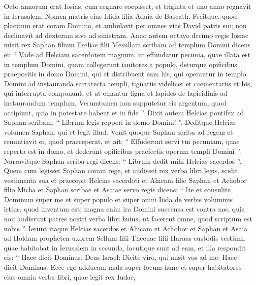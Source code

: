 \begin{biblechapter}
\begin{biblechapter}
\begin{biblechapter}
\begin{biblechapter}
\begin{biblechapter}
\begin{biblechapter}
\begin{biblechapter}
\begin{biblechapter}
\begin{biblechapter}
\begin{biblechapter}
\begin{biblechapter}
\begin{biblechapter}
\begin{biblechapter}
\begin{biblechapter}
\begin{biblechapter}
\begin{biblechapter}
\begin{biblechapter}
\begin{biblechapter}
\begin{biblechapter}
\begin{biblechapter}
\begin{biblechapter}
\begin{biblechapter}
 \verse Octo annorum erat Iosias, cum regnare coepisset, et triginta et uno anno regnavit in Ierusalem. Nomen matris eius Idida filia Adaia de Bascath. 
\verse Fecitque, quod placitum erat coram Domino, et ambulavit per omnes vias David patris sui; non declinavit ad dexteram sive ad sinistram.
 \verse Anno autem octavo decimo regis Iosiae misit rex Saphan filium Eseliae filii Mesullam scribam ad templum Domini dicens ei: 
\verse “ Vade ad Helciam sacerdotem magnum, ut effundatur pecunia, quae illata est in templum Domini, quam collegerunt ianitores a populo, 
\verse deturque opificibus praepositis in domo Domini, qui et distribuent eam his, qui operantur in templo Domini ad instauranda sartatecta templi, 
\verse tignariis videlicet et caementariis et his, qui interrupta componunt, et ut emantur ligna et lapides de lapicidinis ad instaurandum templum. 
\verse Verumtamen non supputetur eis argentum, quod accipiunt, quia in potestate habent et in fide ”.
 \verse Dixit autem Helcias pontifex ad Saphan scribam: “ Librum legis repperi in domo Domini! ”. Deditque Helcias volumen Saphan, qui et legit illud. 
\verse Venit quoque Saphan scriba ad regem et renuntiavit ei, quod praeceperat, et ait: “ Effuderunt servi tui pecuniam, quae reperta est in domo, et dederunt opificibus praefectis operum templi Domini ”.
 \verse Narravitque Saphan scriba regi dicens: “ Librum dedit mihi Helcias sacerdos ”.
 Quem cum legisset Saphan coram rege, 
\verse et audisset rex verba libri legis, scidit vestimenta sua 
\verse et praecepit Helciae sacerdoti et Ahicam filio Saphan et Achobor filio Micha et Saphan scribae et Asaiae servo regis dicens: 
 \verse “ Ite et consulite Dominum super me et super populo et super omni Iuda de verbis voluminis istius, quod inventum est; magna enim ira Domini succensa est contra nos, quia non audierunt patres nostri verba libri huius, ut facerent omne, quod scriptum est nobis ”.
 \verse Ierunt itaque Helcias sacerdos et Ahicam et Achobor et Saphan et Asaia ad Holdam propheten uxorem Sellum filii Thecuae filii Haraas custodis vestium, quae habitabat in Ierusalem in secunda, locutique sunt ad eam, 
\verse et illa respondit eis: “ Haec dicit Dominus, Deus Israel: Dicite viro, qui misit vos ad me: 
\verse Haec dicit Dominus: Ecce ego adducam mala super locum hunc et super habitatores eius omnia verba libri, quae legit rex Iudae, 

\end{biblechapter}
\end{biblechapter}
\end{biblechapter}
\end{biblechapter}
\end{biblechapter}
\end{biblechapter}
\end{biblechapter}
\end{biblechapter}
\end{biblechapter}
\end{biblechapter}
\end{biblechapter}
\end{biblechapter}
\end{biblechapter}
\end{biblechapter}
\end{biblechapter}
\end{biblechapter}
\end{biblechapter}
\end{biblechapter}
\end{biblechapter}
\end{biblechapter}
\end{biblechapter}
\end{biblechapter}
